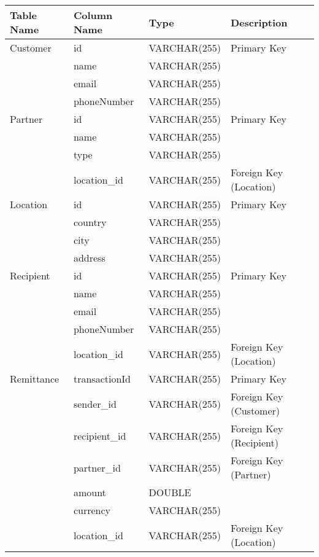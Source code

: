 \documentclass[10pt,a4paper]{article}
\begin{document}
\begin{longtable}{|l|l|l|l|}
\hline
\textbf{Table Name} & \textbf{Column Name} & \textbf{Type} & \textbf{Description} \\ \hline
\endhead

Customer & id & VARCHAR(255) & Primary Key \\ \cline{2-4} 
 & name & VARCHAR(255) &  \\ \cline{2-4} 
 & email & VARCHAR(255) &  \\ \cline{2-4} 
 & phoneNumber & VARCHAR(255) &  \\ \hline
 
Partner & id & VARCHAR(255) & Primary Key \\ \cline{2-4} 
 & name & VARCHAR(255) &  \\ \cline{2-4} 
 & type & VARCHAR(255) &  \\ \cline{2-4} 
 & location\_id & VARCHAR(255) & Foreign Key (Location) \\ \hline

Location & id & VARCHAR(255) & Primary Key \\ \cline{2-4} 
 & country & VARCHAR(255) &  \\ \cline{2-4} 
 & city & VARCHAR(255) &  \\ \cline{2-4} 
 & address & VARCHAR(255) &  \\ \hline

Recipient & id & VARCHAR(255) & Primary Key \\ \cline{2-4} 
 & name & VARCHAR(255) &  \\ \cline{2-4} 
 & email & VARCHAR(255) &  \\ \cline{2-4} 
 & phoneNumber & VARCHAR(255) &  \\ \cline{2-4} 
 & location\_id & VARCHAR(255) & Foreign Key (Location) \\ \hline
 
Remittance & transactionId & VARCHAR(255) & Primary Key \\ \cline{2-4} 
 & sender\_id & VARCHAR(255) & Foreign Key (Customer) \\ \cline{2-4} 
 & recipient\_id & VARCHAR(255) & Foreign Key (Recipient) \\ \cline{2-4} 
 & partner\_id & VARCHAR(255) & Foreign Key (Partner) \\ \cline{2-4} 
 & amount & DOUBLE &  \\ \cline{2-4} 
 & currency & VARCHAR(255) &  \\ \cline{2-4} 
 & location\_id & VARCHAR(255) & Foreign Key (Location) \\ \hline

\end{longtable}
\end{document}
